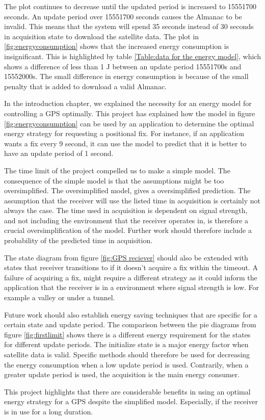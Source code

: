 The plot continues to decrease until the updated period is increased to 15551700 seconds. An update period over 15551700 seconds causes the Almanac to be invalid. This means that the system will spend 35 seconds instead of 30 seconds in acquisition state to download the satellite data. The plot in \ref{fig:energyconsumption} shows that the increased energy consumption is insignificant. This is highlighted by table \ref{Table:data for the energy model}, which shows a difference of less than 1 J between an update period 15551700s and 15552000s. The small difference in energy consumption is because of the small penalty that is added to download a valid Almanac. 

In the introduction chapter, we explained the necessity for an energy model for controlling a GPS optimally. This project has explained how the model in figure \ref{fig:energyconsumption} can be used by an application to determine the optimal energy strategy for requesting a positional fix. For instance, if an application wants a fix every 9 second, it can use the model to predict that it is better to have an update period of 1 second.

The time limit of the project compelled us to make a simple model. The consequence of the simple model is that the assumptions might be too oversimplified. The oversimplified model, gives a oversimplified prediction. The assumption that the receiver will use the listed time in acquisition is certainly not always the case. The time used in acquisition is dependent on signal strength, and not including the environment that the receiver operates in, is therefore a crucial oversimplification of the model. Further work should therefore include a probability of the predicted time in acquisition. 

The state diagram from figure \ref{fig:GPS reciever} should also be extended with states that receiver transitions to if it doesn't acquire a fix within the timeout. A failure of acquiring a fix, might require a different strategy as it could inform the application that the receiver is in a environment where signal strength is low. For example a valley or under a tunnel. 

Future work should also establish energy saving techniques that are specific for a certain state and update period. The comparison between the pie diagrams from figure \ref{fig:firstlimit} shows there is a different energy requirement for the states for different update periods. The initialize state is a major energy factor when satellite data is valid. Specific methods should therefore be used for decreasing the energy consumption when a low update period is used. Contrarily, when a greater update period is used, the acquisition is the main energy consumer. 

This project highlights that there are considerable benefits in using an optimal energy strategy for a GPS despite the simplified model. Especially, if the receiver is in use for a long duration. 
